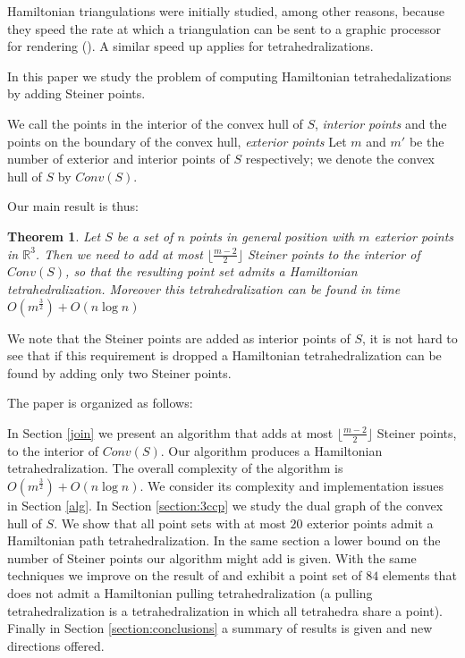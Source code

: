 \documentclass{article}
\newtheorem{theorem}{Theorem}
\newcommand{\Conv}{\mathit{Conv}}
\begin{document}
Hamiltonian triangulations were initially studied,
among other reasons, because they speed
the rate at which a triangulation can be sent
to a graphic processor for rendering (\cite{skiena, spacetradeoffs}).
A similar speed up applies for tetrahedralizations.\par

In this paper we study the problem of computing
Hamiltonian tetrahedalizations by adding Steiner 
points.\par

We call the points in the interior of the convex hull of 
$S$, \emph{interior points} and the points on the
boundary of the convex hull, \emph{exterior points}
Let $m$ and $m'$ be the number of exterior and
interior points of $S$ respectively; 
we denote the convex hull of $S$ by $Conv(S)$.\par

Our main result is thus:

\begin{theorem}\label{teo:main}
Let $S$ be a set of $n$ points in general position with $m$ exterior points in $\mathbb{R}^3$. Then we need to add at most $\lfloor \frac{m-2}{2} \rfloor$ Steiner points to the interior
of  $\Conv(S)$, so that the resulting point
set admits a Hamiltonian tetrahedralization. Moreover this tetrahedralization can
be found in time $O(m^{\frac{3}{2}})+O(n\log n)$
\end{theorem}

We note that the Steiner points are added as interior points of $S$, it is not
hard to see that if this requirement is dropped a Hamiltonian tetrahedralization
can be found by adding only two Steiner points.\par

The paper is organized as follows:\par

In Section \ref{join} we present an algorithm that adds at most $\lfloor \frac{m-2}{2} \rfloor$
Steiner points,  to the interior of $\Conv(S)$.
Our algorithm produces a Hamiltonian
tetrahedralization.
The overall complexity
of the algorithm is $O(m^\frac{3}{2}) +  O(n \log n)$. We consider its complexity
and implementation issues in Section \ref{alg}.
In Section \ref{section:3ccp} we study the dual graph of the convex hull
of $S$. We show that all point sets with at most $20$ exterior points 
admit a Hamiltonian path tetrahedralization. In the same section a lower bound 
on the number of Steiner points our algorithm might add is given. With the same techniques
we improve on the result of  \cite{isora} and exhibit a point set of $84$ elements
that does not admit a Hamiltonian pulling tetrahedralization (a pulling tetrahedralization
is a tetrahedralization in which all tetrahedra share a point).
Finally in Section \ref{section:conclusions} a summary of results is given and new directions offered.
\par
\end{document}
